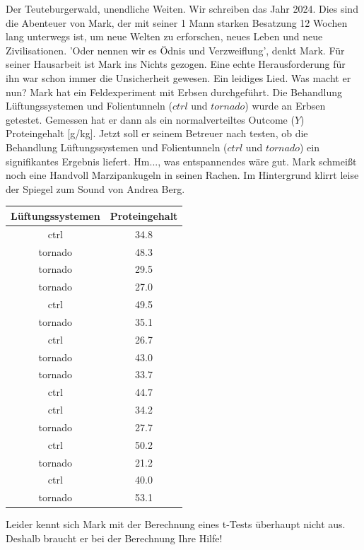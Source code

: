\documentclass[a4paper, 9pt]{scrartcl}\usepackage[]{graphicx}\usepackage[]{xcolor}
\begin{document}
Der Teuteburgerwald, unendliche Weiten. Wir schreiben das Jahr 2024. Dies sind die Abenteuer von Mark, der mit seiner 1 Mann starken Besatzung 12 Wochen lang unterwegs ist, um neue Welten zu erforschen, neues Leben und neue Zivilisationen. 'Oder nennen wir es Ödnis und Verzweiflung', denkt Mark. Für seiner Hausarbeit ist Mark ins Nichts gezogen. Eine echte Herausforderung für ihn war schon immer die Unsicherheit gewesen. Ein leidiges Lied. Was macht er nun? Mark hat ein Feldexperiment mit Erbsen durchgeführt. Die Behandlung Lüftungssystemen und Folientunneln ($ctrl$ und $tornado$) wurde an Erbsen getestet. Gemessen hat er dann als ein normalverteiltes Outcome ($Y$) Proteingehalt [g/kg]. Jetzt soll er seinem Betreuer nach testen, ob die Behandlung Lüftungssystemen und Folientunneln ($ctrl$ und $tornado$) ein signifikantes Ergebnis liefert. Hm..., was entspannendes wäre gut. Mark schmeißt noch eine Handvoll Marzipankugeln in seinen Rachen. Im Hintergrund klirrt leise der Spiegel zum Sound von Andrea Berg.

\begin{table}[!h]
\centering
\begin{tabular}{cc}
\toprule
Lüftungssystemen & Proteingehalt\\
\midrule
ctrl & 34.8\\
tornado & 48.3\\
tornado & 29.5\\
tornado & 27.0\\
ctrl & 49.5\\
\addlinespace
tornado & 35.1\\
ctrl & 26.7\\
tornado & 43.0\\
tornado & 33.7\\
ctrl & 44.7\\
\addlinespace
ctrl & 34.2\\
tornado & 27.7\\
ctrl & 50.2\\
tornado & 21.2\\
ctrl & 40.0\\
\addlinespace
tornado & 53.1\\
\bottomrule
\end{tabular}
\end{table}



Leider kennt sich Mark mit der Berechnung eines t-Tests überhaupt nicht aus. Deshalb braucht er bei der Berechnung Ihre Hilfe!
\end{document}
